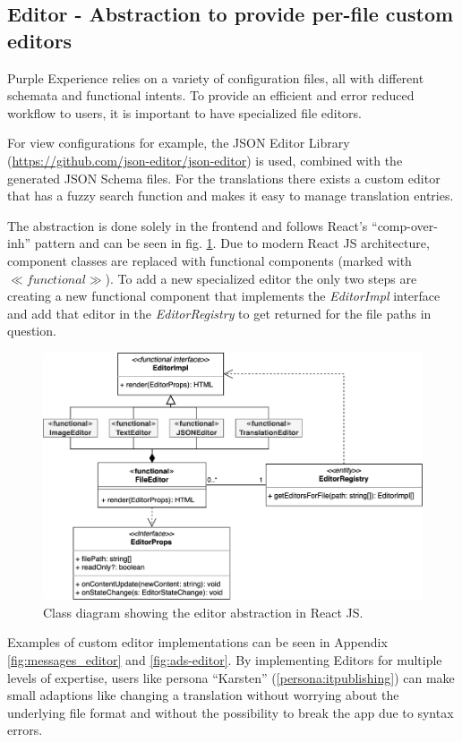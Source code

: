 \subsection{Editor - Abstraction to provide per-file custom editors}

Purple Experience relies on a variety of configuration files, all with different schemata and functional intents.
To provide an efficient and error reduced workflow to users, it is important to have specialized file editors.

For view configurations for example, the JSON Editor Library (\url{https://github.com/json-editor/json-editor}) is used, combined with the generated JSON Schema files. For the translations there exists a custom editor that has a fuzzy search function and makes it easy to manage translation entries.

The abstraction is done solely in the frontend and follows React's ``\Gls{comp-over-inh}'' pattern and can be seen in fig. \ref{fig:abstract-editor}. Due to modern React JS architecture, component classes are replaced with functional components (marked with $\ll functional\gg$).
To add a new specialized editor the only two steps are creating a new functional component that implements the \textit{EditorImpl} interface
and add that editor in the \textit{EditorRegistry} to get returned for the file paths in question.
\begin{figure}[h!]
  \includegraphics[width=\textwidth]{pics/abstract_editor_uml.drawio.png}
  \caption{Class diagram showing the editor abstraction in React JS.}
  \label{fig:abstract-editor}
\end{figure}
Examples of custom editor implementations can be seen in Appendix \ref{fig:messages_editor} and \ref{fig:ads-editor}.
By implementing Editors for multiple levels of expertise, users like persona ``Karsten'' (\ref{persona:itpublishing}) can make small adaptions like changing a translation without worrying about the underlying file format and without the possibility to break the app due to syntax errors.

